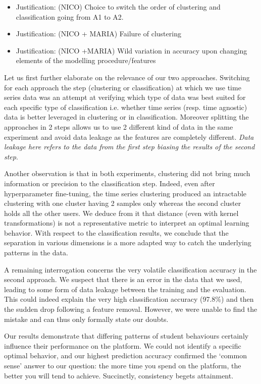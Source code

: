 \documentclass[sigplan,screen]{acmart}
\begin{document}
{\color{red}
\begin{itemize}
\item Justification: (NICO) Choice to switch the order of clustering and classification going from A1 to A2. 
    \item Justification: (NICO + MARIA) Failure of clustering
    \item Justification: (NICO +MARIA) Wild variation in accuracy upon changing elements of the modelling procedure/features
\end{itemize}

}
Let us first further elaborate on the relevance of our two approaches. Switching for each approach the step (clustering or classification) at which we use time series data was an attempt at verifying which type of data was best suited for each specific type of classification i.e. whether time series (resp. time agnostic) data is better leveraged in clustering or in classification. Moreover splitting the approaches in 2 steps allows us to use 2 different kind of data in the same experiment and avoid data leakage as the features are completely different. \textit{Data leakage here refers to the data from the first step biasing the results of the second step}.

Another observation is that in both experiments, clustering did not bring much information or precision to the classification step. Indeed, even after hyperparameter fine-tuning, the time series clustering produced an intractable clustering with one cluster having 2 samples only whereas the second cluster holds all the other users. We deduce from it that distance (even with kernel transformations) is not a representative metric to interpret an optimal learning behavior. With respect to the classification results, we conclude that the separation in various dimensions is a more adapted way to catch the underlying patterns in the data.

A remaining interrogation concerns the very volatile classification accuracy in the second approach. We suspect that there is an error in the data that we used, leading to some form of data leakage between the training and the evaluation. This could indeed explain the very high classification accuracy (97.8\%) and then the sudden drop following a feature removal. However, we were unable to find the mistake and can thus only formally state our doubts.

Our results demonstrate that differing patterns of student behaviours certainly influence their performance on the platform. We could not identify a specific optimal behavior, and our highest prediction accuracy confirmed the `common sense' answer to our question: the more time you spend on the platform, the better you will tend to achieve. Succinctly, consistency begets attainment. 
\end{document}
